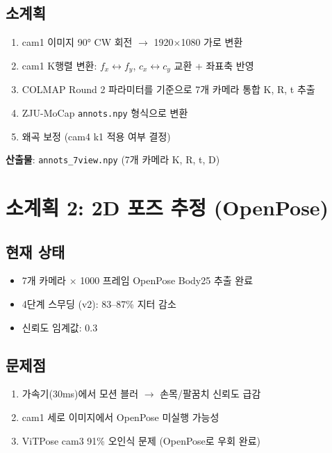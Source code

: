 \documentclass[11pt, a4paper]{report}
\begin{document}
\subsection{소계획}
\begin{pipelinebox}[title={SP-1: 캘리브레이션 7-view 통합}]
\begin{enumerate}
\item cam1 이미지 90° CW 회전 $\to$ 1920$\times$1080 가로 변환
\item cam1 K행렬 변환: $f_x \leftrightarrow f_y$, $c_x \leftrightarrow c_y$ 교환 + 좌표축 반영
\item COLMAP Round 2 파라미터를 기준으로 7개 카메라 통합 K, R, t 추출
\item ZJU-MoCap \texttt{annots.npy} 형식으로 변환
\item 왜곡 보정 (cam4 k1 적용 여부 결정)
\end{enumerate}
\textbf{산출물}: \texttt{annots\_7view.npy} (7개 카메라 K, R, t, D)
\end{pipelinebox}


\section{소계획 2: 2D 포즈 추정 (OpenPose)}
\label{sec:sp2}

\subsection{현재 상태}
\begin{itemize}
\item 7개 카메라 $\times$ 1000 프레임 OpenPose Body25 추출 완료
\item 4단계 스무딩 (v2): 83--87\% 지터 감소
\item 신뢰도 임계값: 0.3
\end{itemize}

\subsection{문제점}
\begin{enumerate}
\item 가속기(30ms)에서 모션 블러 $\to$ 손목/팔꿈치 신뢰도 급감
\item cam1 세로 이미지에서 OpenPose 미실행 가능성
\item ViTPose cam3 91\% 오인식 문제 (OpenPose로 우회 완료)
\end{enumerate}
\end{document}
